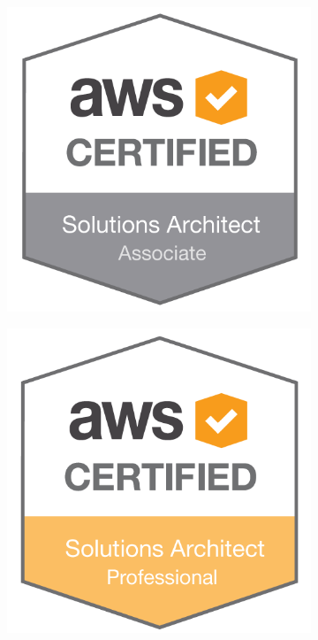 \documentclass[print]{cv-a4}
\begin{document}
\begin{figure}[h!]
  \centering
  \begin{subfigure}[b]{0.2\linewidth}
    \includegraphics[width=\linewidth]{images/SAA.png}
  \end{subfigure}
  \begin{subfigure}[b]{0.2\linewidth}
    \includegraphics[width=\linewidth]{images/SAP.png}

\end{subfigure}
\end{figure}
\end{document}
